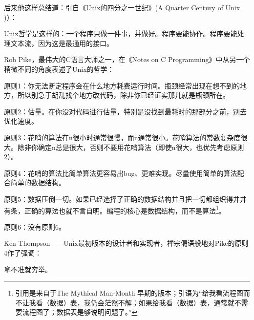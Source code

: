\documentclass[12pt,oneside]{book}
\begin{document}
后来他这样总结道：引自《Unix的四分之一世纪》(A Quarter Century of Unix \cite{Salus})）：

Unix哲学是这样的：一个程序只做一件事，并做好。程序要能协作。程序要能处理文本流，因为这是最通用的接口。
    
Rob Pike，最伟大的C语言大师之一，在《Notes on C  Programming》中从另一个稍微不同的角度表述了Unix的哲学\cite{Pike}：

原则1：你无法断定程序会在什么地方耗费运行时间。瓶颈经常出现在想不到的地方，所以别急于胡乱找个地方改代码，除非你已经证实那儿就是瓶颈所在。

原则2：估量。在你没对代码进行估量，特别是没找到最耗时的那部分之前，别去优化速度。

原则3：花哨的算法在n很小时通常很慢，而n通常很小。花哨算法的常数复杂度很大。除非你确定n总是很大，否则不要用花哨算法（即使n很大，也优先考虑原则2）。

原则4：花哨的算法比简单算法更容易出bug、更难实现。尽量使用简单的算法配合简单的数据结构。

原则5：数据压倒一切。如果已经选择了正确的数据结构并且把一切都组织得井井有条，正确的算法也就不言自明。编程的核心是数据结构，而不是算法\footnote{引用是来自于The Mythical Man-Month \cite{Brooks}早期的版本；引语为“给我看流程图而不让我看（数据）表，我仍会茫然不解；如果给我看（数据）表，通常就不需要流程图了；数据表是够说明问题了。”}。

原则6：没有原则6。

Ken Thompson——Unix最初版本的设计者和实现者，禅宗偈语般地对Pike的原则4作了强调：

拿不准就穷举。
    
\end{document}
